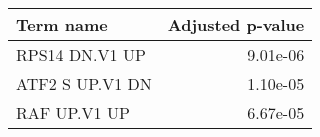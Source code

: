 \begin{tabular}{lr}
\toprule
      Term name &  Adjusted p-value \\
\midrule
 RPS14 DN.V1 UP &          9.01e-06 \\
ATF2 S UP.V1 DN &          1.10e-05 \\
   RAF UP.V1 UP &          6.67e-05 \\
\bottomrule
\end{tabular}
